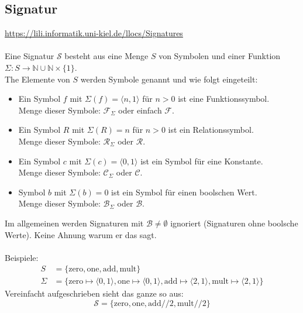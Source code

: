 \documentclass[twocolumn]{article}
\begin{document}
    \subsection{Signatur}
    \url{https://lili.informatik.uni-kiel.de/llocs/Signatures}\\\\
    Eine Signatur $\mathcal S$ besteht aus eine Menge $S$ von Symbolen und einer Funktion $\Sigma \colon S \to \mathbb N \cup \mathbb N \times \{1\}$.\\
    The Elemente von $S$ werden Symbole genannt und wie folgt eingeteilt:
    \begin{itemize}
        \item Ein Symbol $f$ mit $\Sigma(f) = \langle n, 1\rangle$ für $n > 0$ ist eine Funktionssymbol.\\
        Menge dieser Symbole: $\mathcal F_\Sigma$ oder einfach $\mathcal F$.
        \item Ein Symbol $R$ mit $\Sigma(R) = n$ für $n > 0$ ist ein Relationssymbol.\\
        Menge dieser Symbole: $\mathcal R_\Sigma$ oder $\mathcal R$.
        \item Ein Symbol $c$ mit $\Sigma(c) = \langle 0,1\rangle$ ist ein Symbol für eine Konstante.\\
        Menge dieser Symbole: $\mathcal C_\Sigma$ oder $\mathcal C$.
        \item Symbol $b$ mit $\Sigma(b) = 0$ ist ein Symbol für einen boolschen Wert. \\
        Menge dieser Symbole: $\mathcal B_\Sigma$ oder $\mathcal B$.
    \end{itemize}
    Im allgemeinen werden Signaturen mit $\mathcal B \neq \emptyset$ ignoriert (Signaturen ohne boolsche Werte). Keine Ahnung warum er das sagt.\\\\
    Beispiele:
    \begin{align*}
        S &= \{\text{zero}, \text{one}, \text{add}, \text{mult}\}\\
        \Sigma &= \{\text{zero} \mapsto \langle 0,1\rangle, \text{one} \mapsto \langle 0,1\rangle, \text{add} \mapsto \langle 2,1\rangle, \text{mult} \mapsto \langle 2,1\rangle\}
    \end{align*}
   Vereinfacht aufgeschrieben sieht das ganze so aus:
    $$\mathcal S = \{\text{zero}, \text{one}, \text{add}/\!/2, \text{mult}/\!/2\}$$
\end{document}
